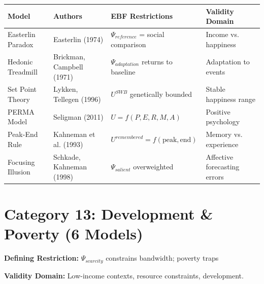 \small
\begin{longtable}{@{}p{3cm}p{2.5cm}p{4cm}p{4cm}@{}}
\toprule
\textbf{Model} & \textbf{Authors} & \textbf{EBF Restrictions} & \textbf{Validity Domain} \\
\midrule
\endhead

Easterlin Paradox & Easterlin (1974) &
$\Psi_{reference}$ = social comparison &
Income vs. happiness \\

Hedonic Treadmill & Brickman, Campbell (1971) &
$\Psi_{adaptation}$ returns to baseline &
Adaptation to events \\

Set Point Theory & Lykken, Tellegen (1996) &
$U^{SWB}$ genetically bounded &
Stable happiness range \\

PERMA Model & Seligman (2011) &
$U = f(P, E, R, M, A)$ &
Positive psychology \\

Peak-End Rule & Kahneman et al. (1993) &
$U^{remembered} = f(\text{peak}, \text{end})$ &
Memory vs. experience \\

Focusing Illusion & Schkade, Kahneman (1998) &
$\Psi_{salient}$ overweighted &
Affective forecasting errors \\

\bottomrule
\end{longtable}
\normalsize

\section{Category 13: Development \& Poverty (6 Models)}
\label{sec:ms-development}

\begin{tcolorbox}[colback=gray!5!white, colframe=gray!75!black,
    title=\textbf{Development: The Scarcity Extension}]

\textbf{Defining Restriction:} $\Psi_{scarcity}$ constrains bandwidth; poverty traps

\textbf{Validity Domain:} Low-income contexts, resource constraints, development.

\end{tcolorbox}


